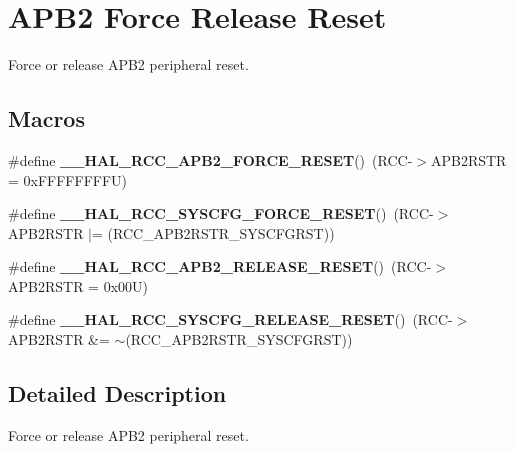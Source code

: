 \hypertarget{group___r_c_c___a_p_b2___force___release___reset}{}\section{A\+P\+B2 Force Release Reset}
\label{group___r_c_c___a_p_b2___force___release___reset}


Force or release A\+P\+B2 peripheral reset.  


\subsection*{Macros}
\begin{DoxyCompactItemize}
\item 
\mbox{\label{group___r_c_c___a_p_b2___force___release___reset_ga8788da8c644ad0cc54912baede7d49b4}} 
\#define {\bfseries \+\_\+\+\_\+\+H\+A\+L\+\_\+\+R\+C\+C\+\_\+\+A\+P\+B2\+\_\+\+F\+O\+R\+C\+E\+\_\+\+R\+E\+S\+ET}()~(R\+CC-\/$>$A\+P\+B2\+R\+S\+TR = 0x\+F\+F\+F\+F\+F\+F\+F\+F\+U)
\item 
\mbox{\label{group___r_c_c___a_p_b2___force___release___reset_ga143ff27d8f59a39732efd79539e3765a}} 
\#define {\bfseries \+\_\+\+\_\+\+H\+A\+L\+\_\+\+R\+C\+C\+\_\+\+S\+Y\+S\+C\+F\+G\+\_\+\+F\+O\+R\+C\+E\+\_\+\+R\+E\+S\+ET}()~(R\+CC-\/$>$A\+P\+B2\+R\+S\+TR $\vert$= (R\+C\+C\+\_\+\+A\+P\+B2\+R\+S\+T\+R\+\_\+\+S\+Y\+S\+C\+F\+G\+R\+ST))
\item 
\mbox{\label{group___r_c_c___a_p_b2___force___release___reset_gae1e413d623154942d5bbe89769161ece}} 
\#define {\bfseries \+\_\+\+\_\+\+H\+A\+L\+\_\+\+R\+C\+C\+\_\+\+A\+P\+B2\+\_\+\+R\+E\+L\+E\+A\+S\+E\+\_\+\+R\+E\+S\+ET}()~(R\+CC-\/$>$A\+P\+B2\+R\+S\+TR = 0x00\+U)
\item 
\mbox{\label{group___r_c_c___a_p_b2___force___release___reset_ga56de80d50f5ab276ebdeee16a0e2a31b}} 
\#define {\bfseries \+\_\+\+\_\+\+H\+A\+L\+\_\+\+R\+C\+C\+\_\+\+S\+Y\+S\+C\+F\+G\+\_\+\+R\+E\+L\+E\+A\+S\+E\+\_\+\+R\+E\+S\+ET}()~(R\+CC-\/$>$A\+P\+B2\+R\+S\+TR \&= $\sim$(R\+C\+C\+\_\+\+A\+P\+B2\+R\+S\+T\+R\+\_\+\+S\+Y\+S\+C\+F\+G\+R\+ST))
\end{DoxyCompactItemize}


\subsection{Detailed Description}
Force or release A\+P\+B2 peripheral reset. 

